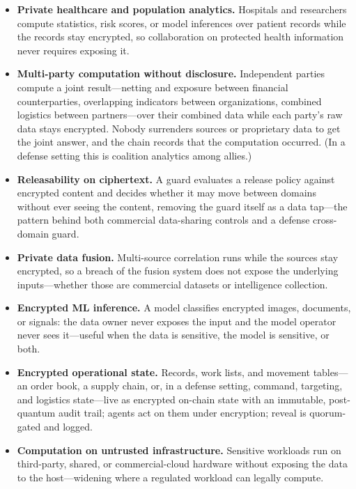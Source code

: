 \documentclass[11pt,letterpaper]{article}
\begin{document}
\begin{itemize}
  \item \textbf{Private healthcare and population analytics.} Hospitals and
  researchers compute statistics, risk scores, or model inferences over patient
  records while the records stay encrypted, so collaboration on protected health
  information never requires exposing it.
  \item \textbf{Multi-party computation without disclosure.} Independent parties
  compute a joint result---netting and exposure between financial counterparties,
  overlapping indicators between organizations, combined logistics between
  partners---over their combined data while each party's raw data stays encrypted.
  Nobody surrenders sources or proprietary data to get the joint answer, and the
  chain records that the computation occurred. (In a defense setting this is
  coalition analytics among allies.)
  \item \textbf{Releasability on ciphertext.} A guard evaluates a release
  policy against encrypted content and decides whether it may move between domains
  without ever seeing the content, removing the guard itself as a data tap---the
  pattern behind both commercial data-sharing controls and a defense cross-domain
  guard.
  \item \textbf{Private data fusion.} Multi-source correlation runs while
  the sources stay encrypted, so a breach of the fusion system does not expose the
  underlying inputs---whether those are commercial datasets or intelligence
  collection.
  \item \textbf{Encrypted ML inference.} A model classifies encrypted images,
  documents, or signals: the data owner never exposes the input and the model
  operator never sees it---useful when the data is sensitive, the model is
  sensitive, or both.
  \item \textbf{Encrypted operational state.} Records, work lists, and movement
  tables---an order book, a supply chain, or, in a defense setting, command,
  targeting, and logistics state---live as encrypted on-chain state with an
  immutable, post-quantum audit trail; agents act on them under encryption; reveal
  is quorum-gated and logged.
  \item \textbf{Computation on untrusted infrastructure.} Sensitive workloads run on
  third-party, shared, or commercial-cloud hardware without exposing the data to
  the host---widening where a regulated workload can legally compute.
\end{itemize}
\end{document}

